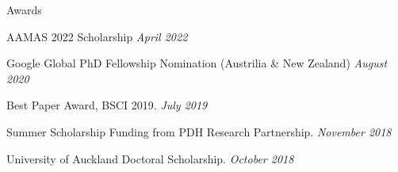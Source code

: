 \documentclass{resume} %
\begin{document}
\begin{rSection}{Awards}
\begin{rSubsection}{}{}{}{}
\item AAMAS 2022 Scholarship \hfill {\em April 2022}
\item Google Global PhD Fellowship Nomination (Austrilia \& New Zealand) \hfill {\em August 2020}
\item Best Paper Award, BSCI 2019. \hfill {\em July 2019}
\item Summer Scholarship Funding from PDH Research Partnership. \hfill {\em November 2018}
\item University of Auckland Doctoral Scholarship. \hfill {\em October 2018}
\end{rSubsection}
\end{rSection}

\end{document}
